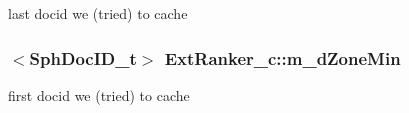last docid we (tried) to cache 

\hypertarget{classExtRanker__c_a8a82c2ae9386d302221a30b191b9f33b}{
\subsubsection[{m\-\_\-d\-Zone\-Min}]{$<${\bf Sph\-Doc\-I\-D\-\_\-t}$>$ Ext\-Ranker\-\_\-c\-::m\-\_\-d\-Zone\-Min\hspace{0.3cm}{\ttfamily [protected]}}}\label{classExtRanker__c_a8a82c2ae9386d302221a30b191b9f33b}


first docid we (tried) to cache 

